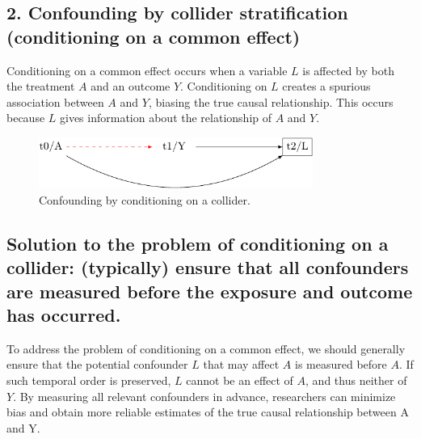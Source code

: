 \documentclass[
  singlecolumn]{report}
\begin{document}
\hypertarget{confounding-by-collider-stratification-conditioning-on-a-common-effect}{%
\subsection{2. Confounding by collider stratification (conditioning on a
common
effect)}\label{confounding-by-collider-stratification-conditioning-on-a-common-effect}}

Conditioning on a common effect occurs when a variable \(L\) is affected
by both the treatment \(A\) and an outcome \(Y\). Conditioning on \(L\)
creates a spurious association between \(A\) and \(Y\), biasing the true
causal relationship. This occurs because \(L\) gives information about
the relationship of \(A\) and \(Y\).

\begin{figure}

{\centering \includegraphics[width=0.8\textwidth,height=\textheight]{causal-dags_files/figure-pdf/fig-dag-common-effect-1.pdf}

}

\caption{\label{fig-dag-common-effect}Confounding by conditioning on a
collider.}

\end{figure}

\hypertarget{solution-to-the-problem-of-conditioning-on-a-collider-typically-ensure-that-all-confounders-are-measured-before-the-exposure-and-outcome-has-occurred.}{%
\subsection{Solution to the problem of conditioning on a collider:
(typically) ensure that all confounders are measured before the exposure
and outcome has
occurred.}\label{solution-to-the-problem-of-conditioning-on-a-collider-typically-ensure-that-all-confounders-are-measured-before-the-exposure-and-outcome-has-occurred.}}

To address the problem of conditioning on a common effect, we should
generally ensure that the potential confounder \(L\) that may affect
\(A\) is measured before \(A\). If such temporal order is preserved,
\(L\) cannot be an effect of \(A\), and thus neither of \(Y\). By
measuring all relevant confounders in advance, researchers can minimize
bias and obtain more reliable estimates of the true causal relationship
between A and Y.
\end{document}
